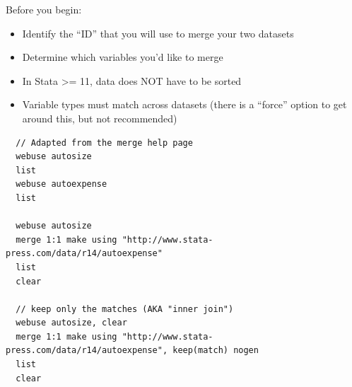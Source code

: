 \documentclass[]{book}
\providecommand{\tightlist}{%
  \setlength{\itemsep}{0pt}\setlength{\parskip}{0pt}}
\begin{document}
Before you begin:

\begin{itemize}
\tightlist
\item
  Identify the ``ID'' that you will use to merge your two datasets
\item
  Determine which variables you'd like to merge
\item
  In Stata \textgreater{}= 11, data does NOT have to be sorted
\item
  Variable types must match across datasets (there is a ``force'' option to get around this, but not recommended)
\end{itemize}

\begin{verbatim}
  // Adapted from the merge help page
  webuse autosize 
  list
  webuse autoexpense
  list

  webuse autosize
  merge 1:1 make using "http://www.stata-press.com/data/r14/autoexpense"
  list
  clear

  // keep only the matches (AKA "inner join")
  webuse autosize, clear
  merge 1:1 make using "http://www.stata-press.com/data/r14/autoexpense", keep(match) nogen
  list
  clear
\end{verbatim}
\end{document}

